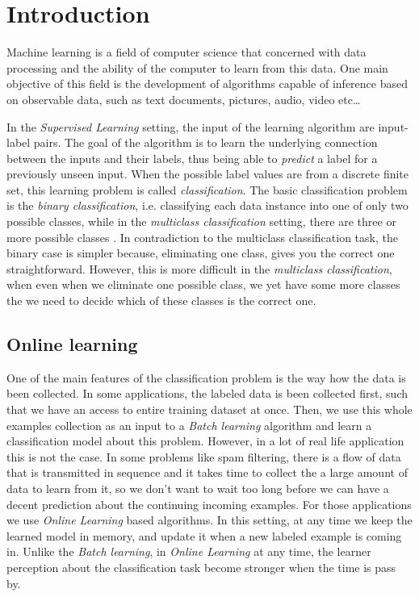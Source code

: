 \chapter{Introduction}


Machine learning is a  field of computer science that concerned with data processing and the ability
of the computer to learn from this data. 
One main objective of this field is the development of algorithms capable of inference based on 
observable data, such as text documents, pictures, audio, video etc\ldots 
 
In the \textit{Supervised Learning} setting, the input of the learning algorithm are input-label pairs. 
The goal of the algorithm is to learn the underlying connection between the inputs and their labels, 
thus being able to \textit{predict} a label for a previously unseen input. 
When the possible label values are from a discrete finite set, this learning problem is called
 \textit{classification}. The basic classification problem is the \textit{binary classification}, i.e. classifying 
 each data instance into one of only two possible classes, while in the \textit{multiclass classification} setting, 
 there are three or more possible classes . In contradiction to the multiclass classification task, the binary 
 case is simpler because, eliminating one class, gives you the correct one 
 straightforward. However, this is more difficult in the \textit{multiclass 
 classification}, when even when we eliminate one possible class, we yet have 
 some more classes the we need to decide which of these classes  is the correct one. 
 

\section{Online learning}
\label{sec:online_learning}

One of the main features of the classification problem is the way how the data is been collected. 
In some applications, the labeled data is been collected first, such that we have an access to entire training
 dataset at once. Then, we use this whole examples collection as an input to 
 a \textit{Batch learning} algorithm and learn a classification model about this problem. 
However, in a lot of real life application this is not the case. In some problems like spam filtering, there is
a flow of data that is transmitted in sequence and it takes time to collect the a large amount of data to learn
 from it, so we don't want to wait too long before we can have a decent prediction about the continuing
  incoming examples. For those applications we use  \textit{Online Learning} based algorithms. 
  In this setting, at any time we keep the learned model in memory, and update it when 
  a new labeled example is coming in.
Unlike the \textit{Batch learning}, in \textit{Online Learning} at any time, 
the learner perception about the classification task become stronger when the time is pass by.
 
